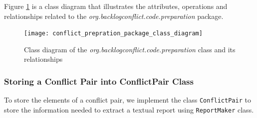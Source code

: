 Figure \ref{fig:conflict_prepration_package_class_diagram} is a class diagram that illustrates the attributes, operations and relationships related to the \textit{org.backlogconflict.code.preparation} package.
\begin{figure}[h]
	\centering
	\texttt{[image: conflict\_prepration\_package\_class\_diagram]}
	\caption{Class diagram of the \textit{org.backlogconflict.code.preparation} class and its relationships}\label{fig:conflict_prepration_package_class_diagram}
\end{figure}
\subsubsection*{Storing a Conflict Pair into ConflictPair Class}
To store the elements of a conflict pair, we implement the class \texttt{ConflictPair} to store the information needed to extract a textual report using \texttt{ReportMaker} class.

